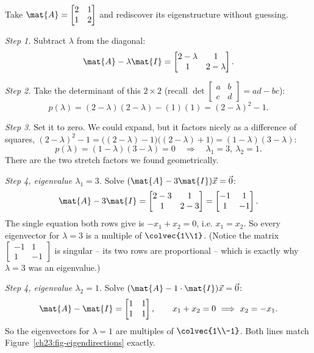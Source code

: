 \begin{example}
\label{ch23:ex-running}
Take $\mat{A}=\begin{bmatrix}2&1\\1&2\end{bmatrix}$ and rediscover its
eigenstructure without guessing.

\emph{Step 1.} Subtract $\lambda$ from the diagonal:
\[
  \mat{A}-\lambda\mat{I}=\begin{bmatrix}2-\lambda & 1\\ 1 & 2-\lambda\end{bmatrix}.
\]

\emph{Step 2.} Take the determinant of this $2\times 2$ (recall
$\det\begin{bmatrix}a&b\\c&d\end{bmatrix}=ad-bc$):
\[
  p(\lambda)=(2-\lambda)(2-\lambda)-(1)(1)=(2-\lambda)^2-1.
\]

\emph{Step 3.} Set it to zero. We could expand, but it factors nicely as a
difference of squares, $(2-\lambda)^2-1=\bigl((2-\lambda)-1\bigr)\bigl((2-\lambda)+1\bigr)=(1-\lambda)(3-\lambda)$:
\[
  p(\lambda)=(1-\lambda)(3-\lambda)=0\quad\Longrightarrow\quad
  \lambda_1=3,\ \lambda_2=1.
\]
There are the two stretch factors we found geometrically.

\emph{Step 4, eigenvalue $\lambda_1=3$.} Solve
$(\mat{A}-3\mat{I})\vec{x}=\vec{0}$:
\[
  \mat{A}-3\mat{I}=\begin{bmatrix}2-3 & 1\\ 1 & 2-3\end{bmatrix}
  =\begin{bmatrix}-1 & 1\\ 1 & -1\end{bmatrix}.
\]
The single equation both rows give is $-x_1+x_2=0$, i.e. $x_1=x_2$. So every
eigenvector for $\lambda=3$ is a multiple of $\colvec{1\\1}$. (Notice the matrix
$\begin{bmatrix}-1&1\\1&-1\end{bmatrix}$ is singular -- its two rows are
proportional -- which is exactly why $\lambda=3$ was an eigenvalue.)

\emph{Step 4, eigenvalue $\lambda_2=1$.} Solve
$(\mat{A}-1\cdot\mat{I})\vec{x}=\vec{0}$:
\[
  \mat{A}-\mat{I}=\begin{bmatrix}1 & 1\\ 1 & 1\end{bmatrix},\qquad
  x_1+x_2=0\ \Longrightarrow\ x_2=-x_1.
\]
So the eigenvectors for $\lambda=1$ are multiples of $\colvec{1\\-1}$. Both lines
match Figure~\ref{ch23:fig-eigendirections} exactly.
\end{example}

